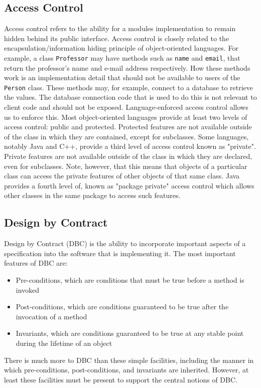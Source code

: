 \documentclass[12pt,a4paper,final,twoside,onecolumn,titlepage]{book}
\begin{document}
\subsection{Access Control}
Access control refers to the ability for a modules implementation to remain hidden behind its public interface. Access control is closely related to the encapsulation/information hiding principle of object-oriented languages. For example, a class \texttt{Professor} may have methods such as \texttt{name} and \texttt{email}, that return the professor's name and e-mail address respectively. How these methods work is an implementation detail that should not be available to users of the \texttt{Person} class. These methods may, for example, connect to a database to retrieve the values. The database connection code that is used to do this is not relevant to client code and should not be exposed. Language-enforced access control allows us to enforce this.
Most object-oriented languages provide at least two levels of access control: public and protected. Protected features are not available outside of the class in which they are contained, except for subclasses. Some languages, notably Java and C++, provide a third level of access control known as "private". Private features are not available outside of the class in which they are declared, even for subclasses. Note, however, that this means that objects of a particular class can access the private features of other objects of that same class. Java provides a fourth level of, known as "package private" access control which allows other classes in the same package to access such features.

\subsection{Design by Contract}
Design by Contract (DBC) is the ability to incorporate important aspects of a specification into the software that is implementing it. The most important features of DBC are:
\begin{itemize}
\item Pre-conditions, which are conditions that must be true before a method is invoked
\item Post-conditions, which are conditions guaranteed to be true after the invocation of a method
\item Invariants, which are conditions guaranteed to be true at any stable point during the lifetime of an object
\end{itemize}
There is much more to DBC than these simple facilities, including the manner in which pre-conditions, post-conditions, and invariants are inherited. However, at least these facilities must be present to support the central notions of DBC.
\end{document}
